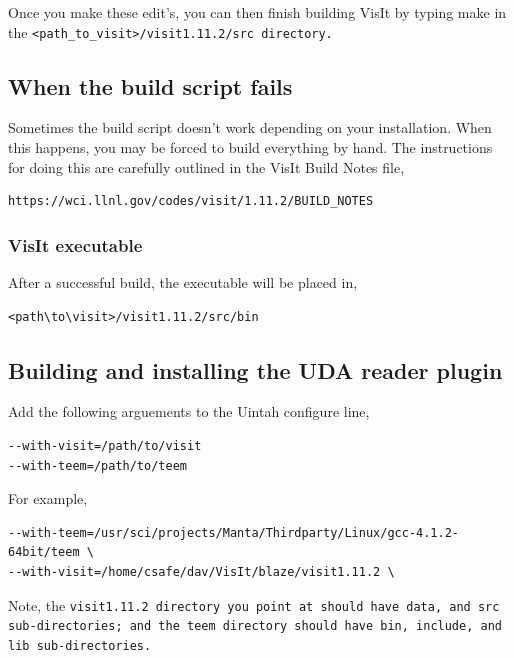 \documentclass[12pt]{report}
\begin{document}
\normalfont Once you make these edit's, you can then finish building VisIt by typing make in the \tt <path\_to\_visit>/visit1.11.2/src \normalfont directory.  

\subsection{When the build script fails}
\label{sec:WhenTheBuildsSriptFails}

Sometimes the build script doesn't work depending on your installation. When this happens, you may be forced to build everything by hand. The instructions for doing this are carefully outlined in the VisIt Build Notes file, 

\begin{Verbatim}[fontsize=\footnotesize]
https://wci.llnl.gov/codes/visit/1.11.2/BUILD_NOTES
\end{Verbatim}

\subsubsection{VisIt executable}
\label{sec:VisItExecutable}

After a successful build, the executable will be placed in,

\begin{Verbatim}[fontsize=\footnotesize]
<path\to\visit>/visit1.11.2/src/bin
\end{Verbatim}

\subsection{Building and installing the UDA reader plugin}
\label{sec:BuildingAndInstallingUDAPlugin}

Add the following arguements to the Uintah configure line,

\begin{Verbatim}[fontsize=\footnotesize]
--with-visit=/path/to/visit 
--with-teem=/path/to/teem
\end{Verbatim}

For example,

\begin{Verbatim}[fontsize=\footnotesize]
--with-teem=/usr/sci/projects/Manta/Thirdparty/Linux/gcc-4.1.2-64bit/teem \
--with-visit=/home/csafe/dav/VisIt/blaze/visit1.11.2 \
\end{Verbatim}

Note, the \tt visit1.11.2 \normalfont directory you point at should have \tt data\normalfont , and \tt src \normalfont sub-directories; and the \tt teem \normalfont directory should have \tt bin\normalfont , \tt include\normalfont , and \tt lib \normalfont sub-directories.
\end{document}
